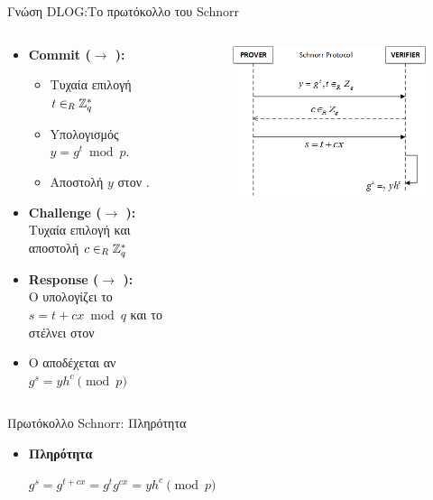 \documentclass[handout]{beamer}
\begin{document}
\begin{frame}[allowframebreaks]{Γνώση DLOG:Το πρωτόκολλο του Schnorr}
\framebreak
\begin{columns}
\begin{small}
\begin{itemize}
\item  \textbf{Commit (\prv $\rightarrow$ \ver):} 
\begin{itemize}
\item Τυχαία επιλογή $t \in_R \mathbb{Z}^*_{q}$ 
\item Yπολογισμός $y = g^t \bmod{p}$. 
\item Αποστολή $y$  στον \ver. 
\end{itemize}
\item \textbf{Challenge (\ver $\rightarrow$ \prv):} \\  Τυχαία επιλογή και αποστολή $c \in_R \mathbb{Z}^*_{q}$
\item \textbf{Response (\prv $\rightarrow$ \ver):} \\   O \prv υπολογίζει το $s=t+cx \bmod{q}$ και το στέλνει στον \ver
\item  Ο \ver αποδέχεται αν\\ $g^s = yh^c \pmod{p}$
\end{itemize}
\end{small}
\begin{figure}
\includegraphics[width=1\textwidth]{schnorr.png}
\end{figure}
\end{columns}
\end{frame}

\begin{frame}{Πρωτόκολλο Schnorr: Πληρότητα}
 
\begin{itemize}
\item \textbf{Πληρότητα}\\

\pause
\begin{center}
$g^s = g^{t+cx} = g^t g^{cx} = yh^c \pmod{p}$
\end{center}



\end{itemize}
\end{frame}
\end{document}
